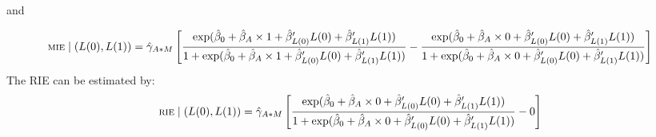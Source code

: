 \documentclass[
]{book}
\begin{document}
and

\[ \scriptsize \text{MIE} \mid (L(0), L(1)) = \hat{\gamma}_{A \ast M} \left[ \frac{\exp (\hat{\beta}_0 + \hat{\beta}_A \times 1 + \hat{\beta}_{L(0)}^\prime L(0) + \hat{\beta}_{L(1)}^\prime L(1))}{1 + \exp (\hat{\beta}_0 + \hat{\beta}_A \times 1 + \hat{\beta}_{L(0)}^\prime L(0) + \hat{\beta}_{L(1)}^\prime L(1))} - \frac{\exp (\hat{\beta}_0 + \hat{\beta}_A \times 0 + \hat{\beta}_{L(0)}^\prime L(0) + \hat{\beta}_{L(1)}^\prime L(1))}{1 + \exp (\hat{\beta}_0 + \hat{\beta}_A \times 0 + \hat{\beta}_{L(0)}^\prime L(0) + \hat{\beta}_{L(1)}^\prime L(1))}\right]\]
The RIE can be estimated by:
\[\scriptsize
\text{RIE} \mid (L(0), L(1)) = \hat{\gamma}_{A \ast M} \left[ \frac{\exp (\hat{\beta}_0 + \hat{\beta}_A \times 0 + \hat{\beta}_{L(0)}^\prime L(0) + \hat{\beta}_{L(1)}^\prime L(1))}{1 + \exp (\hat{\beta}_0 + \hat{\beta}_A \times 0 + \hat{\beta}_{L(0)}^\prime L(0) + \hat{\beta}_{L(1)}^\prime L(1))} - 0 \right]\]
\end{document}
